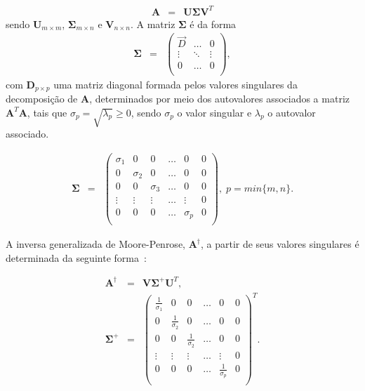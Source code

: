 \begin{eqnarray}
\mathbf{A} &=& \mathbf{U}\mathbf{\Sigma} \mathbf{V}^T
\end{eqnarray}
sendo $\mathbf{U}_{m\times m}$, $\mathbf{\Sigma}_{m\times n}$ e $\mathbf{V}_{n\times n}$. A matriz $\mathbf{\Sigma}$ é da forma
\begin{eqnarray}
\mathbf{\Sigma} &=& 
\left( \begin{array}{ccc}
\vec{D}     & \ldots & 0 \\
\vdots & \ddots & \vdots \\
0     & \ldots & 0 \\
\end{array} \right), \label{eq:matzSigma}
\end{eqnarray}
com $\mathbf{D}_{p\times p}$ uma matriz diagonal formada pelos valores singulares da decomposição de $\mathbf{A}$, determinados por meio dos autovalores associados a matriz $\mathbf{A}^T\mathbf{A}$, tais que $\sigma_p = \sqrt{\lambda_p} \geq 0$, sendo $\sigma_p$ o valor singular e $\lambda_p$ o autovalor associado.

\begin{eqnarray}
\mathbf{\Sigma} &=& 
\left( \begin{array}{cccccc}
\sigma_1 & 0        &    0     & \ldots & 0   & 0   \\
0     & \sigma_2 &    0     & \ldots & 0   & 0   \\
0     &    0     & \sigma_3 & \ldots & 0   & 0   \\
\vdots & \vdots   &  \vdots  & \ldots & \vdots   & 0 \\
0      &    0     &    0     & \ldots & \sigma_p & 0\\
\end{array} \right), \; p = min\{m,n\}.\label{eq:matzSigma2}
\end{eqnarray}

A inversa generalizada de Moore-Penrose, $\mathbf{A}^\dagger$, a partir de seus valores singulares é determinada da seguinte forma~\cite{macausland2014}:

\begin{eqnarray}
\mathbf{A}^\dagger &=& \mathbf{V}\mathbf{\Sigma}^+\mathbf{U}^T, \\
\mathbf{\Sigma}^+ &=& 
\left( \begin{array}{cccccc}
\frac{1}{\sigma_1} &      0             &      0              & \ldots &        0       &     0 \\
0              & \frac{1}{\sigma_2} &      0              & \ldots &        0       &     0 \\
0              &      0             & \frac{1}{\sigma_2}  & \ldots &        0       &     0 \\
\vdots          &   \vdots           &     \vdots          & \ldots &       \vdots   &     0 \\
0              &      0             &      0              & \ldots & \frac{1}{\sigma_p} & 0 \\
\end{array} \right)^T. \label{eq:matzSigma3}
\end{eqnarray}

